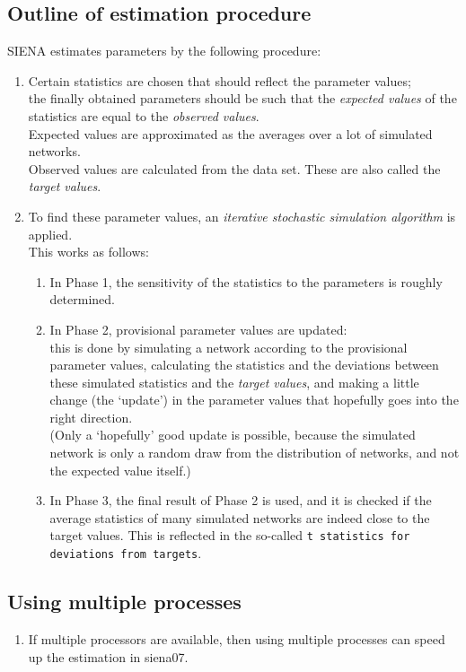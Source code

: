 \documentclass[a4paper,fleqn,11pt]{article}
\newcommand{\+}{\, + \,}
\newcommand{\sfn}[1]{\textsf{#1}}
\newcommand{\SI}{{\sf SIENA }}
\begin{document}
{\subsection{Outline of estimation procedure}
\noindent
\SI estimates parameters by the following procedure:
\begin{enumerate}
\item  Certain statistics are chosen that should reflect the parameter values;\\
  the finally obtained parameters should be such that the \emph{expected
    values}
  of the statistics are equal to the \emph{observed values}.\\
  Expected values are approximated as the averages over a lot of simulated
  networks.\\
  Observed values are calculated from the data set. These are also called the
  \emph{target values}.
\item To find these parameter values, an \emph{iterative stochastic simulation
    algorithm}
  is applied.\\
  This works as follows:
\begin{enumerate}
\item In Phase 1, the sensitivity of the statistics to the parameters is roughly
  determined.
\item In Phase 2, provisional parameter values are updated:\\
  this is done by simulating a network according to the provisional parameter
  values, calculating the statistics and the deviations between these simulated
  statistics and the \emph{target values}, and making a little change (the
  `update') in the parameter values
  that hopefully goes into the right direction.\\
  (Only a `hopefully' good update is possible, because the simulated network is
  only a random draw from the distribution of networks, and not the expected
  value itself.)
\item In Phase 3, the final result of Phase 2 is used, and it is checked if the
  average statistics of many simulated networks are indeed close to the target
  values. This is reflected in the so-called \texttt{t statistics for deviations
    from targets}.
\end{enumerate}
\end{enumerate}

\subsection{Using multiple processes}
\label{S_multipleProcesses}
\begin{enumerate}
\item
If multiple processors are available, then using
multiple processes can speed up the estimation in \sfn{siena07}.


\end{enumerate}}
\end{document}

